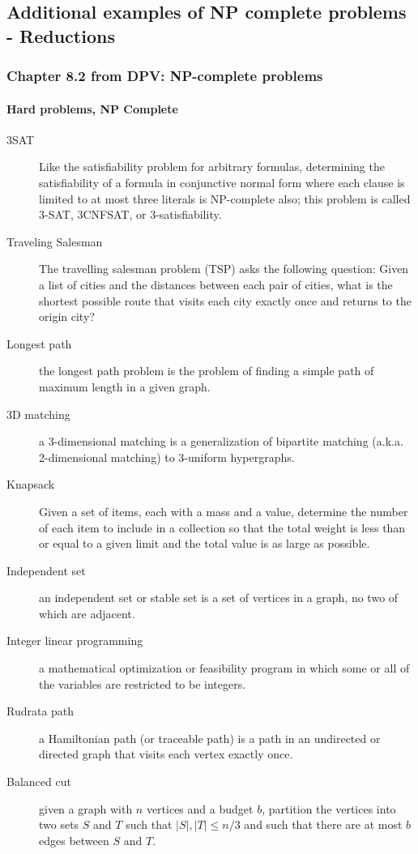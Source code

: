 \documentclass[a4paper,11pt]{article}
\begin{document}
\subsection{Additional examples of NP complete problems -
Reductions}\label{additional-examples-of-np-complete-problems---reductions}

\subsubsection{Chapter 8.2 from DPV: NP-complete
problems}\label{chapter-8.2-from-dpv-np-complete-problems}

\paragraph{Hard problems, NP Complete}\label{hard-problems-np-complete}

\begin{description}
\item[3SAT]
Like the satisfiability problem for arbitrary formulas, determining the
satisfiability of a formula in conjunctive normal form where each clause
is limited to at most three literals is NP-complete also; this problem
is called 3-SAT, 3CNFSAT, or 3-satisfiability.
\item[Traveling Salesman]
The travelling salesman problem (TSP) asks the following question: Given
a list of cities and the distances between each pair of cities, what is
the shortest possible route that visits each city exactly once and
returns to the origin city?
\item[Longest path]
the longest path problem is the problem of finding a simple path of
maximum length in a given graph.
\item[3D matching]
a 3-dimensional matching is a generalization of bipartite matching
(a.k.a. 2-dimensional matching) to 3-uniform hypergraphs.
\item[Knapsack]
Given a set of items, each with a mass and a value, determine the number
of each item to include in a collection so that the total weight is less
than or equal to a given limit and the total value is as large as
possible.
\item[Independent set]
an independent set or stable set is a set of vertices in a graph, no two
of which are adjacent.
\item[Integer linear programming]
a mathematical optimization or feasibility program in which some or all
of the variables are restricted to be integers.
\item[Rudrata path]
a Hamiltonian path (or traceable path) is a path in an undirected or
directed graph that visits each vertex exactly once.
\item[Balanced cut]
given a graph with $n$ vertices and a budget $b$, partition the vertices
into two sets $S$ and $T$ such that $|S|,|T| \le n/3$ and such that
there are at most $b$ edges between $S$ and $T$.
\end{description}
\end{document}
